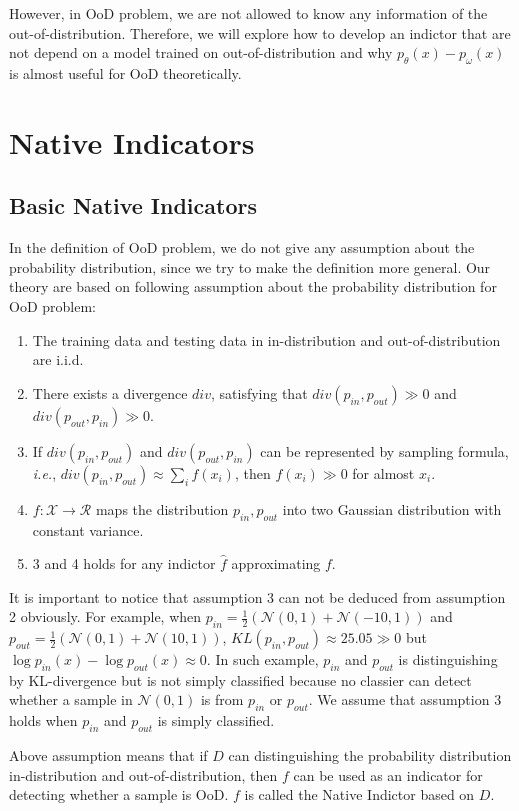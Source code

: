 \documentclass[letterpaper]{article} %
\newcommand{\IE}{\textit{i.e.}, }
\newcommand{\pin}{p_{in}}
\newcommand{\pout}{p_{out}}
\begin{document}
However, in OoD problem, we are not allowed to know any information of the out-of-distribution. 
Therefore, we will explore how to develop an indictor that are not depend on a model trained on out-of-distribution and why $p_\theta(x) - p_\omega(x)$ is almost useful for OoD theoretically. 

\section{Native Indicators}
\subsection{Basic Native Indicators}
In the definition of OoD problem, we do not give any assumption about the probability distribution, since we try to make the definition more general. Our theory are based on following assumption about the probability distribution for OoD problem:
\begin{enumerate}
	\item The training data and testing data in in-distribution and out-of-distribution are i.i.d. 
	\item There exists a divergence $div$, satisfying that $div(\pin, \pout) \gg 0$ and $div(\pout, \pin) \gg 0$. 
	\item If $div(\pin, \pout)$ and $div(\pout, \pin)$ can be represented by sampling formula, \IE $div(\pin, \pout) \approx \sum_{i} f(x_i)$, then $f(x_i) \gg 0$ for almost  $x_i$. 
	\item $f: \mathcal{X} \rightarrow \mathcal{R}$ maps the distribution $\pin, \pout$ into two Gaussian distribution with constant variance. 
	\item 3 and 4 holds for any indictor $\hat{f}$ approximating $f$. 
\end{enumerate} 

It is important to notice that assumption 3 can not be deduced from assumption 2 obviously. For example, when $\pin = \frac{1}{2}(\mathcal{N}(0, 1) + \mathcal{N}(-10, 1))$ and $\pout = \frac{1}{2}(\mathcal{N}(0, 1) + \mathcal{N}(10, 1))$, $KL(\pin, \pout) \approx 25.05 \gg 0$ but $\log \pin(x) - \log \pout(x) \approx 0$.  In such example, $\pin$ and $\pout$ is distinguishing by KL-divergence but is not simply classified because no classier can detect whether a sample in $\mathcal{N}(0, 1)$ is from $\pin$ or $\pout$. We assume that assumption 3 holds when $\pin$ and $\pout$ is simply classified. 

Above assumption means that if $D$ can distinguishing the probability distribution                                                                                                        in-distribution and out-of-distribution, then $f$ can be used as an indicator for detecting whether a sample is OoD. $f$ is called the Native Indictor based on $D$. 
\end{document}
